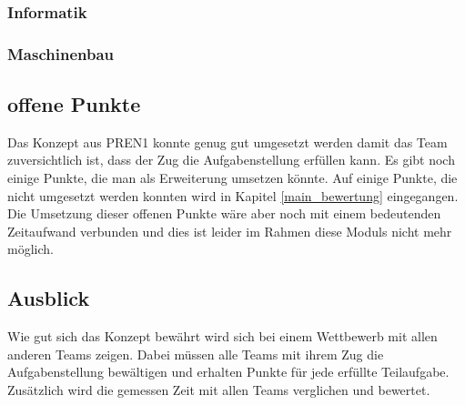 \documentclass[../../main.tex]{subfiles}
\begin{document}
\subsubsection{Informatik}

\subsubsection{Maschinenbau}

\subsection{offene Punkte}
Das Konzept aus PREN1 konnte genug gut umgesetzt werden damit das Team zuversichtlich ist, dass der Zug die Aufgabenstellung erfüllen kann. Es gibt noch einige Punkte, die man als Erweiterung umsetzen könnte. Auf einige Punkte, die nicht umgesetzt werden konnten wird in Kapitel \ref{main_bewertung} eingegangen. Die Umsetzung dieser offenen Punkte wäre aber noch mit einem bedeutenden Zeitaufwand verbunden und dies ist leider im Rahmen diese Moduls nicht mehr möglich.

\subsection{Ausblick}
Wie gut sich das Konzept bewährt wird sich bei einem Wettbewerb mit allen anderen Teams zeigen. Dabei müssen alle Teams mit ihrem Zug die Aufgabenstellung bewältigen und erhalten Punkte für jede erfüllte Teilaufgabe. Zusätzlich wird die gemessen Zeit mit allen Teams verglichen und bewertet.
\end{document}
